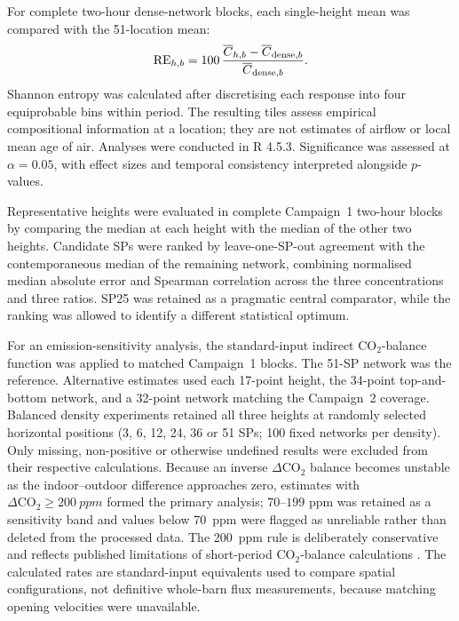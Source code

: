 ﻿\documentclass[12pt,a4paper]{article}
\begin{document}
For complete two-hour dense-network blocks, each single-height mean was compared with the 51-location mean:
\begin{equation}
\mathrm{RE}_{h,b}=100\,\frac{\overline C_{h,b}-\overline C_{{\rm dense},b}}{\overline C_{{\rm dense},b}}.
\end{equation}
Shannon entropy was calculated after discretising each response into four equiprobable bins within period. The resulting tiles assess empirical compositional information at a location; they are not estimates of airflow or local mean age of air. Analyses were conducted in R 4.5.3. Significance was assessed at \(\alpha=0.05\), with effect sizes and temporal consistency interpreted alongside \(p\)-values.

Representative heights were evaluated in complete Campaign~1 two-hour blocks by comparing the median at each height with the median of the other two heights. Candidate SPs were ranked by leave-one-SP-out agreement with the contemporaneous median of the remaining network, combining normalised median absolute error and Spearman correlation across the three concentrations and three ratios. SP25 was retained as a pragmatic central comparator, while the ranking was allowed to identify a different statistical optimum.

For an emission-sensitivity analysis, the standard-input indirect \(\mathrm{CO_2}\)-balance function was applied to matched Campaign~1 blocks. The 51-SP network was the reference. Alternative estimates used each 17-point height, the 34-point top-and-bottom network, and a 32-point network matching the Campaign~2 coverage. Balanced density experiments retained all three heights at randomly selected horizontal positions (3, 6, 12, 24, 36 or 51 SPs; 100 fixed networks per density). Only missing, non-positive or otherwise undefined results were excluded from their respective calculations. Because an inverse \(\Delta\mathrm{CO_2}\) balance becomes unstable as the indoor--outdoor difference approaches zero, estimates with \(\Delta\mathrm{CO_2}\geq\SI{200}{ppm}\) formed the primary analysis; \(70\)--\(199\) ppm was retained as a sensitivity band and values below \SI{70}{ppm} were flagged as unreliable rather than deleted from the processed data. The \SI{200}{ppm} rule is deliberately conservative and reflects published limitations of short-period \(\mathrm{CO_2}\)-balance calculations \citep{Pedersen2008}. The calculated rates are standard-input equivalents used to compare spatial configurations, not definitive whole-barn flux measurements, because matching opening velocities were unavailable.
\end{document}
